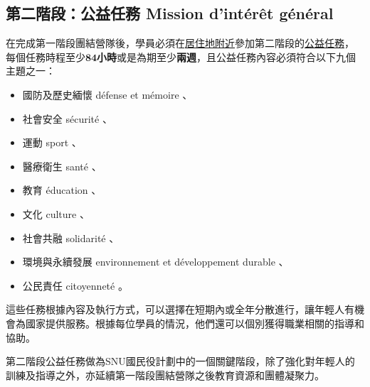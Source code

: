 \documentclass[a4paper,14pt]{extarticle}
\theoremstyle{plain}
\theoremstyle{remark}
\numberwithin{equation}{section}
\begin{document}
\subsection{第二階段：公益任務 Mission d'intérêt général}\label{subsection:mig}

在完成第一階段團結營隊後，學員必須在\underline{居住地附近}參加第二階段的\underline{公益任務}，
每個任務時程至少$\mathbf{84}$\textbf{小時}或是為期至少\textbf{兩週}，且公益任務內容必須符合以下九個主題之一：

\begin{itemize}
  \item 國防及歷史緬懷
    défense et mémoire 、
  \item 社會安全
    sécurité 、
  \item 運動
    sport 、
  \item 醫療衛生
    santé 、
  \item 教育
    éducation 、
  \item 文化
    culture 、
  \item 社會共融
    solidarité 、
  \item 環境與永續發展
    environnement et développement durable 、
  \item 公民責任
    citoyenneté 。
\end{itemize}

這些任務根據內容及執行方式，可以選擇在短期內或全年分散進行，讓年輕人有機會為國家提供服務。根據每位學員的情況，他們還可以個別獲得職業相關的指導和協助。

第二階段公益任務做為SNU國民役計劃中的一個關鍵階段，除了強化對年輕人的訓練及指導之外，亦延續第一階段團結營隊之後教育資源和團體凝聚力。

%
\end{document}
